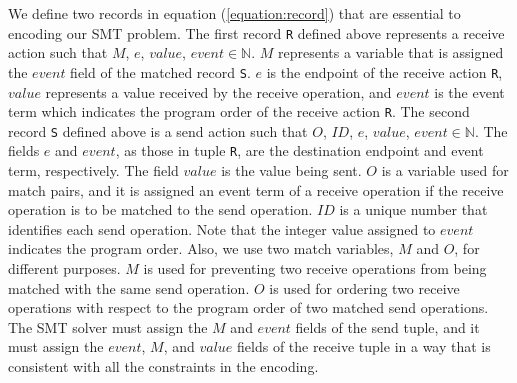 We define two records in equation (\ref{equation:record}) that are essential to encoding our SMT problem. The first record \texttt{R} defined above represents a receive action such that $\mathit{M}$, $\mathit{e}$, $\mathit{value}$, $\mathit{event} \in \mathbb{N}$. $\mathit{M}$ represents a variable that is assigned the $\mathit{event}$ field of the matched record \texttt{S}. $\mathit{e}$ is the endpoint of the receive action \texttt{R}, $\mathit{value}$ represents a value received by the receive operation, and $\mathit{event}$ is the event term which indicates the program order of the receive action \texttt{R}. The second record \texttt{S} defined above is a send action such that $\mathit{O}$, $\mathit{ID}$, $\mathit{e}$, $\mathit{value}$, $\mathit{event} \in \mathbb{N}$. The fields $\mathit{e}$ and $\mathit{event}$, as those in tuple \texttt{R}, are the destination endpoint and event term, respectively. The field $\mathit{value}$ is the value being sent. $\mathit{O}$ is a variable used for match pairs, and it is assigned an event term of a receive operation if the receive operation is to be matched to the send operation. $\mathit{ID}$ is a unique number that identifies each send operation. Note that the integer value assigned to $\mathit{event}$ indicates the program order. Also, we use two match variables, $M$ and $\mathit{O}$, for different purposes. $M$ is used for preventing two receive operations from being matched with the same send operation. $\mathit{O}$ is used for ordering two receive operations with respect to the program order of two matched send operations. The SMT solver must assign the $\mathit{M}$ and $\mathit{event}$ fields of the send tuple, and it must assign the $\mathit{event}$, $\mathit{M}$, and $\mathit{value}$ fields of the receive tuple in a way that is consistent with all the constraints in the encoding.


